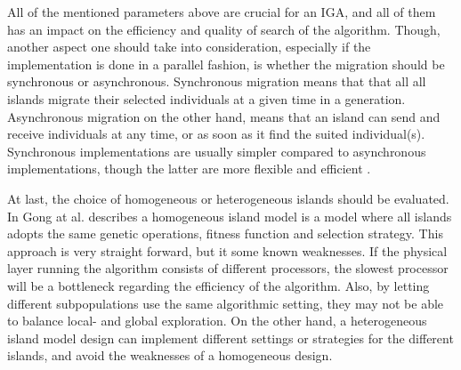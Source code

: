 All of the mentioned parameters above are crucial for an IGA, and all of them has an impact on the efficiency and quality of search of the algorithm. Though, another aspect one should take into consideration, especially if the implementation is done in a parallel fashion, is whether the migration should be synchronous or asynchronous. Synchronous migration means that that all all islands migrate their selected individuals at a given time in a generation. Asynchronous migration on the other hand, means that an island can send and receive individuals at any time, or as soon as it find the suited individual(s). Synchronous implementations are usually simpler compared to asynchronous implementations, though the latter are more flexible and efficient \cite{IGA:dea-and-their-models-survey}. 

At last, the choice of homogeneous or heterogeneous islands should be evaluated. In \cite{IGA:dea-and-their-models-survey} Gong at al. describes a homogeneous island model is a model where all islands adopts the same genetic operations, fitness function and selection strategy. This approach is very straight forward, but it some known weaknesses. If the physical layer running the algorithm consists of different processors, the slowest processor will be a bottleneck regarding the efficiency of the algorithm. Also, by letting different subpopulations use the same algorithmic setting, they may not be able to balance local- and global exploration. On the other hand, a heterogeneous island model design can implement different settings or strategies for the different islands, and avoid the weaknesses of a homogeneous design.



